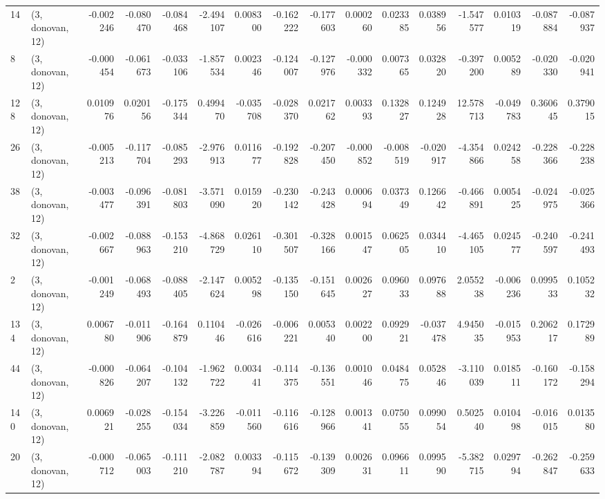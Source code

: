 \begin{tabular}{llrrrrrrrrrrrrrr}
14  &  (3, donovan, 12) &  -0.002246 & -0.080470 & -0.084468 &   -2.494107 &  0.008300 &  -0.162222 & -0.177603 &  0.000260 &  0.023385 &  0.038956 &   -1.547577 &  0.010319 & -0.087884 & -0.087937 \\
8   &  (3, donovan, 12) &  -0.000454 & -0.061673 & -0.033106 &   -1.857534 &  0.002346 &  -0.124007 & -0.127976 & -0.000332 &  0.007365 &  0.032820 &   -0.397200 &  0.005289 & -0.020330 & -0.020941 \\
128 &  (3, donovan, 12) &   0.010976 &  0.020156 & -0.175344 &    0.499470 & -0.035708 &  -0.028370 &  0.021762 &  0.003393 &  0.132827 &  0.124928 &   12.578713 & -0.049783 &  0.360645 &  0.379015 \\
26  &  (3, donovan, 12) &  -0.005213 & -0.117704 & -0.085293 &   -2.976913 &  0.011677 &  -0.192828 & -0.207450 & -0.000852 & -0.008519 & -0.020917 &   -4.354866 &  0.024258 & -0.228366 & -0.228238 \\
38  &  (3, donovan, 12) &  -0.003477 & -0.096391 & -0.081803 &   -3.571090 &  0.015920 &  -0.230142 & -0.243428 &  0.000694 &  0.037349 &  0.126642 &   -0.466891 &  0.005425 & -0.024975 & -0.025366 \\
32  &  (3, donovan, 12) &  -0.002667 & -0.088963 & -0.153210 &   -4.868729 &  0.026110 &  -0.301507 & -0.328166 &  0.001547 &  0.062505 &  0.034410 &   -4.465105 &  0.024577 & -0.240597 & -0.241493 \\
2   &  (3, donovan, 12) &  -0.001249 & -0.068493 & -0.088405 &   -2.147624 &  0.005298 &  -0.135150 & -0.151645 &  0.002627 &  0.096033 &  0.097688 &    2.055238 & -0.006236 &  0.099533 &  0.105232 \\
134 &  (3, donovan, 12) &   0.006780 & -0.011906 & -0.164879 &    0.110446 & -0.026616 &  -0.006221 &  0.005340 &  0.002200 &  0.092921 & -0.037478 &    4.945035 & -0.015953 &  0.206217 &  0.172989 \\
44  &  (3, donovan, 12) &  -0.000826 & -0.064207 & -0.104132 &   -1.962722 &  0.003441 &  -0.114375 & -0.136551 &  0.001046 &  0.048475 &  0.052846 &   -3.110039 &  0.018511 & -0.160172 & -0.158294 \\
140 &  (3, donovan, 12) &   0.006921 & -0.028255 & -0.154034 &   -3.226859 & -0.011560 &  -0.116616 & -0.128966 &  0.001341 &  0.075055 &  0.099054 &    0.502540 &  0.010498 & -0.016015 &  0.013580 \\
20  &  (3, donovan, 12) &  -0.000712 & -0.065003 & -0.111210 &   -2.082787 &  0.003394 &  -0.115672 & -0.139309 &  0.002631 &  0.096611 &  0.099590 &   -5.382715 &  0.029794 & -0.262847 & -0.259633 \\

\end{tabular}
